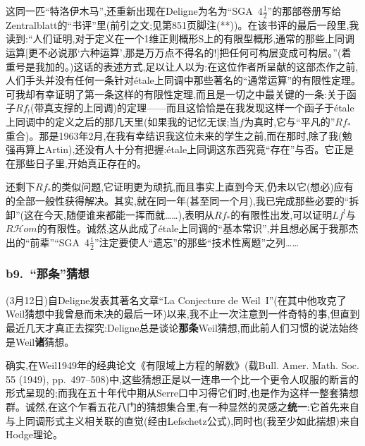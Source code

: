 这同一匹“特洛伊木马”,还重新出现在Deligne为名为“SGA~4$\frac{1}{2}$”的那部卷册写给Zentralblatt的“书评”里(前引之文;见第851页脚注(**))。在该书评的最后一段里,我读到:“人们证明,对于定义在一个1维正则概形S上的有限型概形,通常的那些上同调运算[更不必说那‘六种运算’,那是万万点不得名的!]把任何可构层变成可构层。”(着重号是我加的。)这话的表述方式,足以让人以为:在这位作者所呈献的这部杰作之前,人们手头并没有任何一条针对étale上同调中那些著名的“通常运算”的有限性定理。可我却有幸证明了第一条这样的有限性定理,而且是一切之中最关键的一条:关于函子$Rf_!$(带真支撑的上同调)的定理——而且这恰恰是在我发现这样一个函子于étale上同调中的定义之后的那几天里(如果我的记忆无误;当$f$为真时,它与“平凡的”$Rf_*$重合)。那是1963年2月,在我有幸结识我这位未来的学生之前,而在那时,除了我(勉强再算上Artin),还没有人十分有把握:étale上同调这东西究竟“存在”与否。它正是在那些日子里,开始真正存在的。

还剩下$Rf_*$的类似问题,它证明更为顽抗,而且事实上直到今天,仍未以它(想必)应有的全部一般性获得解决。其实,就在同一年(甚至同一个月),我已完成那些必要的“拆卸”(这在今天,随便谁来都能一挥而就……),表明从$Rf_*$的有限性出发,可以证明$Lf^!$与$R\mathcal{H}om$的有限性。诚然,这从此成了étale上同调的“基本常识”,并且想必属于我那杰出的“前辈”“SGA~4$\frac{1}{2}$”注定要使人“遗忘”的那些“技术性离题”之列……

\subsubsection*{b9.~“那条”猜想}



(3月12日)自Deligne发表其著名文章“La Conjecture de Weil~I”(在其中他攻克了Weil猜想中我曾悬而未决的最后一环)以来,我不止一次注意到一件奇特的事,但直到最近几天才真正去探究:Deligne总是谈论\textbf{那条}Weil猜想,而此前人们习惯的说法始终是Weil\textbf{诸}猜想。

确实,在Weil1949年的经典论文《有限域上方程的解数》(载Bull. Amer. Math. Soc. 55 (1949), pp.~497--508)中,这些猜想正是以一连串一个比一个更令人叹服的断言的形式呈现的;而我在五十年代中期从Serre口中习得它们时,也是作为这样一整套猜想群。诚然,在这个乍看五花八门的猜想集合里,有一种显然的灵感之\textbf{统一}:它首先来自与上同调形式主义相关联的直觉(经由Lefschetz公式),同时也(我至少如此揣想)来自Hodge理论。

